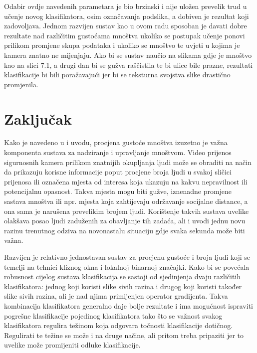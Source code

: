 \documentclass[times, utf8, zavrsni, numeric]{fer}
\begin{document}
\bigbreak

Odabir ovdje navedenih parametara je bio brzinski i nije uložen prevelik trud u učenje novog 
klasifikatora, osim označavanja podslika, a dobiven je rezultat koji zadovoljava. Jednom razvijen
sustav kao u ovom radu sposoban je davati dobre rezultate nad različitim gustoćama mnoštva
ukoliko se postupak učenje ponovi prilikom promjene skupa podataka i ukoliko se mnoštvo te uvjeti
u kojima je kamera znatno ne mijenjaju. Ako bi se sustav naučio na slikama gdje je mnoštvo kao na
slici 7.1, a drugi dan bi se gužva raščistila te bi ulice bile prazne, rezultati klasifikacije bi bili poražavajući
jer bi se teksturna svojstva slike drastično promjenila.

\chapter{Zaključak}

Kako je navedeno u i uvodu, procjena gustoće mnoštva izuzetno je važna komponenta sustava
za nadziranje i upravljanje mnoštvom. Video prijenos sigurnosnih kamera prilikom znatnijih 
okupljanja ljudi može se obraditi na način da prikazuju korisne informacije poput procjene
broja ljudi u svakoj sličici prijenosa ili označena mjesta od interesa koja ukazuju na kakvu 
nepravilnost ili potencijalnu opasnost. Takva mjesta mogu biti gužve, iznenadne promjene
sastava mnoštva ili npr. mjesta koja zahtijevaju održavanje socijalne distance, a ona sama
je narušena prevelikim brojem ljudi. Korištenje takvih sustava uvelike olakšava posao ljudi
zaduženih za obavljanje tih zadaća, ali i uvodi jednu novu razinu trenutnog odziva na novonastalu 
situaciju gdje svaka sekunda može biti važna. 

\bigbreak

Razvijen je relativno jednostavan sustav za procjenu gustoće i broja ljudi koji se temelji na 
tehnici kliznog okna i lokalnoj binarnoj značajki. Kako bi se povećala robusnost cijelog sustava
klasifikacija se sastoji od sjedinjenja dvaju različitih klasifikatora: jednog koji koristi slike
sivih razina i drugog koji koristi također slike sivih razina, ali je nad njima primijenjen operator 
gradijenta. Takva kombinacija klasifikatora generalno daje bolje rezultate i ima mogućnost
ispraviti pogrešne klasifikacije pojedinog klasifikatora tako što se važnost svakog klasifikatora
regulira težinom koja odgovara točnosti klasifikacije dotičnog. Regulirati te težine se može i 
na druge načine, ali pritom treba pripaziti jer to uvelike može promijeniti odluke klasifikacije.
\end{document}
